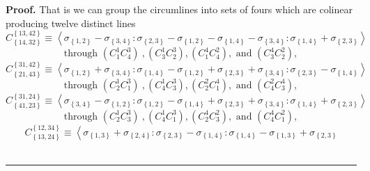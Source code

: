 \documentclass{unswthesis}
\newenvironment{proof}[1][Proof]{\noindent\textbf{#1.} }{\ \rule{0.5em}{0.5em}}
\begin{document}
\begin{proof}
That is we can group the circumlines into sets of fours which are colinear
producing twelve distinct lines%
\begin{equation*}
C_{\left\{ 14,32\right\} }^{\left\{ 13,42\right\} }\equiv \left\langle
\sigma _{\left\{ 1,2\right\} }-\sigma _{\left\{ 3,4\right\} }:\sigma
_{\left\{ 2,3\right\} }-\sigma _{\left\{ 1,2\right\} }-\sigma _{\left\{
1,4\right\} }-\sigma _{\left\{ 3,4\right\} }:\sigma _{\left\{ 1,4\right\}
}+\sigma _{\left\{ 2,3\right\} }\right\rangle 
\end{equation*}%
\begin{equation*}
\text{through }\left( C_{1}^{1}C_{4}^{3}\right) \ ,\left(
C_{3}^{1}C_{2}^{3}\right) ,\left( C_{1}^{4}C_{4}^{2}\right) ,\text{ and }%
\left( C_{3}^{4}C_{2}^{2}\right) , 
\end{equation*}%
\begin{equation*}
C_{\left\{ 21,43\right\} }^{\left\{ 31,42\right\} }\equiv \left\langle
\sigma _{\left\{ 1,2\right\} }+\sigma _{\left\{ 3,4\right\} }:\sigma
_{\left\{ 1,4\right\} }-\sigma _{\left\{ 1,2\right\} }+\sigma _{\left\{
2,3\right\} }+\sigma _{\left\{ 3,4\right\} }:\sigma _{\left\{ 2,3\right\}
}-\sigma _{\left\{ 1,4\right\} }\right\rangle 
\end{equation*}%
\begin{equation*}
\text{through }\left( C_{2}^{1}C_{1}^{3}\right) \ ,\left(
C_{4}^{1}C_{3}^{3}\right) ,\left( C_{2}^{2}C_{1}^{4}\right) ,\text{ and }%
\left( C_{4}^{2}C_{3}^{4}\right) , 
\end{equation*}%
\begin{equation*}
C_{\left\{ 41,23\right\} }^{\left\{ 31,24\right\} }\equiv \left\langle
\sigma _{\left\{ 3,4\right\} }-\sigma _{\left\{ 1,2\right\} }:\sigma
_{\left\{ 1,2\right\} }-\sigma _{\left\{ 1,4\right\} }+\sigma _{\left\{
2,3\right\} }+\sigma _{\left\{ 3,4\right\} }:\sigma _{\left\{ 1,4\right\}
}+\sigma _{\left\{ 2,3\right\} }\right\rangle 
\end{equation*}%
\begin{equation*}
\text{through }\left( C_{2}^{1}C_{3}^{3}\right) \ ,\left(
C_{4}^{1}C_{1}^{3}\right) ,\left( C_{2}^{4}C_{3}^{2}\right) ,\text{ and }%
\left( C_{4}^{4}C_{1}^{2}\right) , 
\end{equation*}%
\begin{equation*}
C_{\left\{ 13,24\right\} }^{\left\{ 12,34\right\} }\equiv \left\langle
\sigma _{\left\{ 1,3\right\} }+\sigma _{\left\{ 2,4\right\} }:\sigma
_{\left\{ 2,3\right\} }-\sigma _{\left\{ 1,4\right\} }:\sigma _{\left\{
1,4\right\} }-\sigma _{\left\{ 1,3\right\} }+\sigma _{\left\{ 2,3\right\}
}
\end{equation*}
\end{proof}
\end{document}
